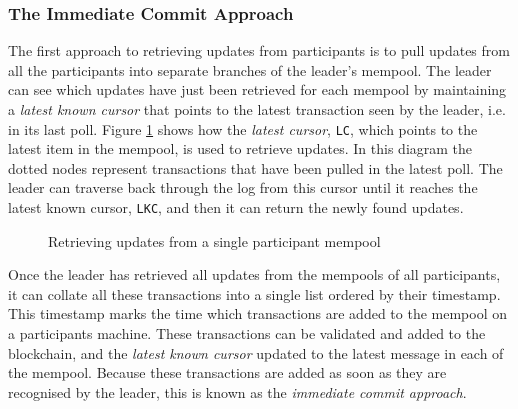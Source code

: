 \documentclass[12pt,a4paper,twoside,openright]{report}
\begin{document}
	\subsubsection*{The Immediate Commit Approach}
	The first approach to retrieving updates from participants is to pull updates from all the participants into separate branches of the leader's mempool.
	The leader can see which updates have just been retrieved for each mempool by maintaining a \textit{latest known cursor} that points to the latest transaction seen by the leader, i.e. in its last poll.
	Figure \ref{fig:readmemudpates} shows how the \textit{latest cursor}, \texttt{LC}, which points to the latest item in the mempool, is used to retrieve updates.
	In this diagram the dotted nodes represent transactions that have been pulled in the latest poll.
	The leader can traverse back through the log from this cursor until it reaches the latest known cursor, \texttt{LKC}, and then it can return the newly found updates.
	\begin{figure}
		\centering
		\caption{Retrieving updates from a single participant mempool}
		\label{fig:readmemudpates}
	\end{figure}
	Once the leader has retrieved all updates from the mempools of all participants, it can collate all these transactions into a single list ordered by their timestamp.
	This timestamp marks the time which transactions are added to the mempool on a participants machine.
	These transactions can be validated and added to the blockchain, and the \textit{latest known cursor} updated to the latest message in each of the mempool.
	Because these transactions are added as soon as they are recognised by the leader, this is known as the \textit{immediate commit approach}.\\
\end{document}
